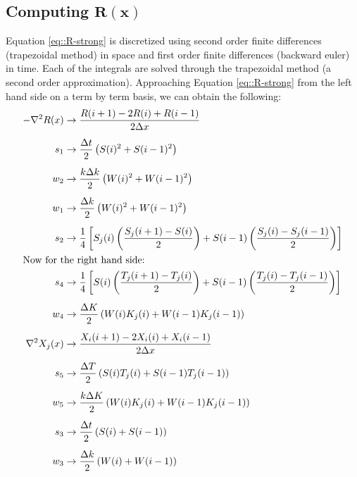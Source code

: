 \documentclass{article}
\def\grad{\mathbf\nabla}
\begin{document}
\subsection{Computing $\mathbf{R(x)}$}
Equation \ref{eq::R-strong} is discretized using second order finite differences (trapezoidal method) in space and first order finite differences (backward euler) in time. Each of the integrals are solved through the trapezoidal method (a second order approximation). Approaching Equation \ref{eq::R-strong} from the left hand side on a term by term basis, we can obtain the following:
\begin{subequations}
\begin{align}
-\grad^2R(x) &\to \frac{R(i+1)-2R(i)+R(i-1)}{2\Delta x}  \\[5pt]
s_1 &\to \frac{\Delta t}{2} \left( S(i)^2 + S(i-1)^2 \right) \\[5pt]
w_2 &\to \frac{k\Delta k}{2}\left( W(i)^2+W(i-1)^2\right)   \\[5pt]
w_1 &\to \frac{\Delta k}{2}\left(W(i)^2 + W(i-1)^2 \right)  \\[5pt]
s_2 &\to \frac{1}{4} \left[ S_j(i)\left( \frac{S_j(i+1)-S(i)}{2} \right) + S(i-1)\left(\frac{S_j(i)-S_j(i-1)}{2}\right) \right] \\
\intertext{Now for the right hand side:}
s_4 &\to \frac{1}{4} \left[ S(i) \left(\frac{T_j(i+1)-T_j(i)}{2} \right) + S(i-1)\left(\frac{T_j(i)-T_j(i-1)}{2} \right) \right] \\[5pt]
w_4 &\to \frac{\Delta K}{2} \left(W(i)K_j(i) + W(i-1)K_j(i-1) \right) \\[5pt]
\grad^2X_j(x) &\to \frac{X_i(i+1)-2X_i(i)+X_i(i-1)}{2\Delta x} \\[5pt]
s_5 &\to \frac{\Delta T}{2} \left(S(i)T_j(i) + S(i-1)T_j(i-1) \right) \\[5pt]
w_5 &\to \frac{k\Delta K}{2} \left(W(i)K_j(i) + W(i-1)K_j(i-1) \right) \\[5pt]
s_3 &\to \frac{\Delta t}{2} \left( S(i) + S(i-1) \right) \\[5pt]
w_3 &\to \frac{\Delta k}{2} \left( W(i) + W(i-1) \right)
\end{align}
\end{subequations}
\end{document}
